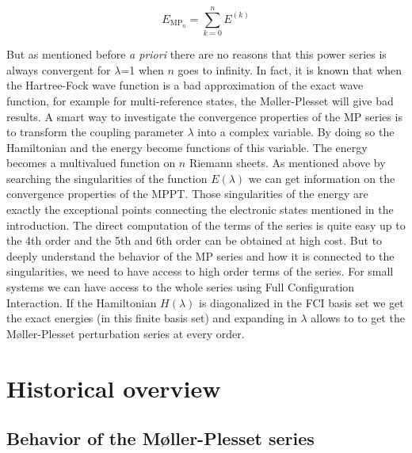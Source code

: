 \documentclass[11pt,a4paper]{article}
\begin{document}
\begin{equation}
E_{\text{MP$_{n}$}}= \sum_{k=0}^n E^{(k)}
\end{equation}

But as mentioned before \textit{a priori} there are no reasons that this power series is always convergent for $\lambda$=1 when $n$ goes to infinity. In fact, it is known that when the Hartree-Fock wave function is a bad approximation of the exact wave function, for example for multi-reference states, the M{\o}ller-Plesset will give bad results\cite{Gill_1986, Gill_1988, Handy_1985, Lepetit_1988}. A smart way to investigate the convergence properties of the MP series is to transform the coupling parameter $\lambda$ into a complex variable. By doing so the Hamiltonian and the energy become functions of this variable. The energy becomes a multivalued function on $n$ Riemann sheets. As mentioned above by searching the singularities of the function $E(\lambda)$ we can get information on the convergence properties of the MPPT. Those singularities of the energy are exactly the exceptional points connecting the electronic states mentioned in the introduction. The direct computation of the terms of the series is quite easy up to the 4th order and the 5th and 6th order can be obtained at high cost. But to deeply understand the behavior of the MP series and how it is connected to the singularities, we need to have access to high order terms of the series. For small systems we can have access to the whole series using Full Configuration Interaction. If the Hamiltonian $H(\lambda)$ is diagonalized in the FCI basis set we get the exact energies (in this finite basis set) and expanding in $\lambda$ allows to to get the M{\o}ller-Plesset perturbation series at every order.

\section{Historical overview}

\subsection{Behavior of the M{\o}ller-Plesset series}
\end{document}
